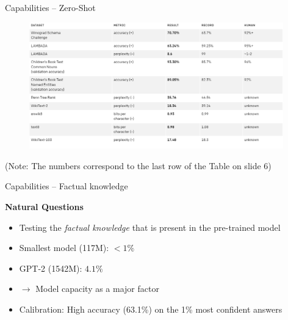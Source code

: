 
\begin{frame}{Capabilities -- Zero-Shot}

\vfill

\begin{figure}
\centering
\includegraphics[width = 11cm]{figure/72-gpt2-zeroshot.png}\\ 
\end{figure}

\vfill

\footnotesize{(Note: The numbers correspond to the last row of the Table on slide 6)}

\end{frame}


\begin{frame}{Capabilities -- Factual knowledge}

\vfill

\textbf{Natural Questions} 

\begin{itemize}
	\item Testing the \textit{factual knowledge} that is present in the pre-trained model
	\item Smallest model (117M): $< 1\%$
	\item GPT-2 (1542M): $4.1\%$
	\item[] $\to$ Model capacity as a major factor
	\item Calibration: High accuracy (63.1\%) on the 1\% most confident answers
\end{itemize}

\vfill

\end{frame}

